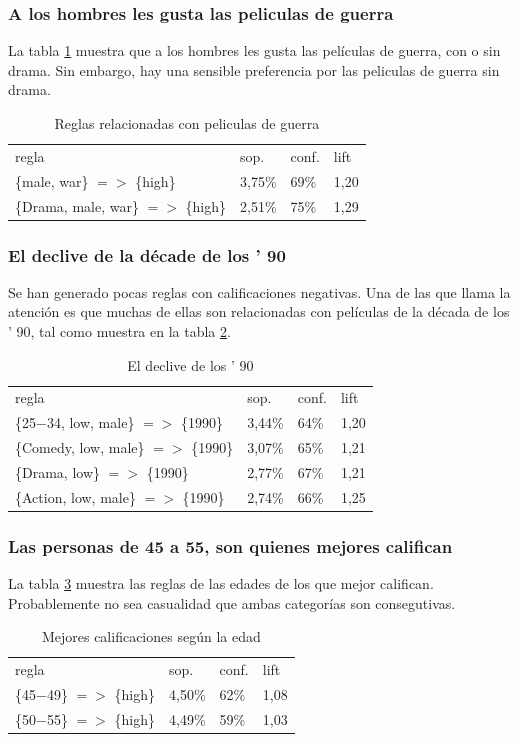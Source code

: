 \documentclass[journal]{IEEEtran}
\begin{document}
\subsubsection{A los hombres les gusta las peliculas de guerra}
La tabla \ref{table_male_ware} muestra que a los hombres
les gusta las películas de guerra, con o sin drama. Sin embargo,
hay una sensible preferencia por las peliculas de guerra sin
drama.

\begin{table}[ht!]
\caption{Reglas relacionadas con peliculas de guerra}
\label{table_male_ware}
\centering
\begin{tabular}{l l l l }
regla & sop. & conf. & lift \\
\{male, war\} $=$$>$ \{high\} & 3,75\% & 69\% & 1,20 \\
\{Drama, male, war\} $=$$>$ \{high\} & 2,51\% & 75\% & 1,29 \\
\end{tabular}
\end{table}

\subsubsection{El declive de la décade de los ' 90}
Se han generado pocas reglas con calificaciones negativas. Una de las
que llama la atención es que muchas de ellas son relacionadas con películas
de la década de los ' 90, tal como muestra en la tabla \ref{table_year_90}.
\begin{table}[ht!]
\caption{El declive de los ' 90}
\label{table_year_90}
\centering
\begin{tabular}{l l l l }
regla & sop. & conf. & lift \\
\{25$-$34, low, male\} $=$$>$ \{1990\} & 3,44\% & 64\% & 1,20 \\
\{Comedy, low, male\} $=$$>$ \{1990\} & 3,07\% & 65\% & 1,21 \\
\{Drama, low\} $=$$>$ \{1990\} & 2,77\% & 67\% & 1,21 \\
\{Action, low, male\} $=$$>$ \{1990\} & 2,74\% & 66\% & 1,25 
\end{tabular}
\end{table}

\subsubsection{Las personas de 45 a 55, son quienes mejores califican}
La tabla \ref{table_age} muestra las reglas de las edades de los que
mejor califican. Probablemente no sea casualidad que ambas categorías 
son consegutivas.
\begin{table}[ht!]
\caption{Mejores calificaciones según la edad}
\label{table_age}
\centering
\begin{tabular}{l l l l }
regla & sop. & conf. & lift \\
\{45$-$49\} $=$$>$ \{high\} & 4,50\% & 62\% & 1,08 \\
\{50$-$55\} $=$$>$ \{high\} & 4,49\% & 59\% & 1,03 \\
\end{tabular}
\end{table}
\end{document}
